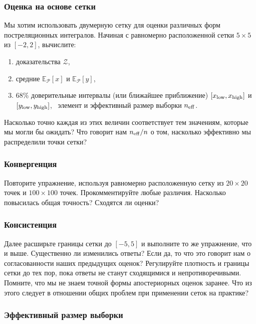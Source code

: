 \documentclass[12pt, titlepage]{article}
\newcommand{\meanwrt}[2]{\ensuremath{\mathbb{E}_{{#2}}\left[{#1}\right]}}
\newcommand{\posterior}{\ensuremath{\mathcal{P}}}
\newcommand{\evidence}{\ensuremath{\mathcal{Z}}}
\begin{document}
\subsubsection*{Оценка на основе сетки}

Мы хотим использовать двумерную сетку для оценки различных форм постреляционных интегралов.
Начиная с равномерно расположенной сетки $5 \times 5$ из $[-2, 2]$, вычислите:
\begin{enumerate}
	\item доказательства $\evidence$,
	\item средние $\meanwrt{x}{\posterior}$
	и $\meanwrt{y}{\posterior}$,
	\item 68\% доверительные интервалы (или ближайшее приближение) 
	$[x_{\rm low}, x_{\rm high}]$ и $[y_{\rm low}, y_{\rm high}]$,
	\ элемент и эффективный размер выборки $n_{\rm eff}$.
\end{enumerate}
Насколько точно каждая из этих величин соответствует тем значениям, которые мы могли бы ожидать? Что говорит нам $n_{\rm eff}/n$ о том, насколько эффективно мы распределили точки сетки?

\subsubsection*{Конвергенция}

Повторите упражнение, используя равномерно расположенную сетку из $20 \times 20$ точек и $100 \times 100$ точек. Прокомментируйте любые различия. Насколько повысилась общая точность? Сходятся ли оценки?

\subsubsection*{Консистенция}

Далее расширьте границы сетки до $[-5, 5]$ и выполните то же упражнение, что и выше. Существенно ли изменились ответы? Если да, то что это говорит нам о согласованности наших предыдущих оценок? Регулируйте плотность и границы сетки до тех пор, пока ответы не станут сходящимися и непротиворечивыми. Помните, что мы не знаем точной формы апостериорных оценок заранее. Что из этого следует в отношении общих проблем при применении сеток на практике?

\subsubsection*{Эффективный размер выборки}
\end{document}
